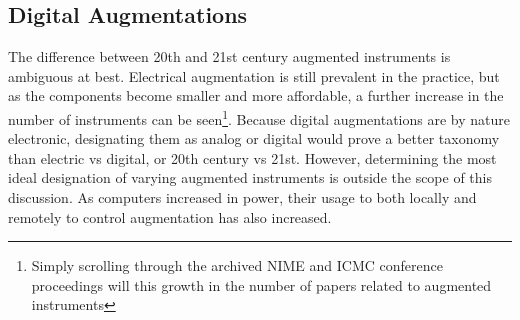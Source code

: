 



\subsection{Digital Augmentations}
The difference between 20th and 21st century augmented instruments is ambiguous at best. Electrical augmentation is still prevalent in the practice, but as the components become smaller and more affordable, a further increase in the number of instruments can be seen\footnote{Simply scrolling through the archived NIME and ICMC conference  proceedings will this growth in the number of papers related to augmented instruments}. Because digital augmentations are by nature electronic, designating them as analog or digital would prove a better taxonomy than electric vs digital, or 20th century vs 21st. However, determining the most ideal designation of varying augmented instruments is outside the scope of this discussion. As computers increased in power, their usage to both locally and remotely to control augmentation has also increased.

